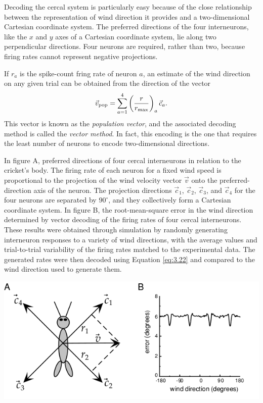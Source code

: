 \begin{rem}
  Decoding the cercal system is particularly easy because of the close relationship between the representation of wind direction it provides and a
two-dimensional Cartesian coordinate system. The preferred directions
of the four interneurons, like the $x$ and $y$ axes of a Cartesian coordinate
system, lie along two perpendicular directions. Four neurons
are required, rather than two, because firing rates cannot represent negative projections.
\end{rem}

\begin{prop}
  If $r_{a}$ is the spike-count fring rate of neuron $a$, an estimate of
  the wind direction on any given trial can be obtained from the
  direction of the vector
  \begin{equation}
    \label{eq:3.22}
    \vec{v}_{\rm{pop}}=\sum\limits_{a=1}^4\left( \frac{r}{r_{\max}} \right)_a\vec{c}_a.
  \end{equation}
  This vector is known as the \emph{population vector}, and the associated decoding
  method is called the \emph{vector method}. In fact, this encoding is
  the one that requires the least number of neurons to encode
  two-dimensional directions.
\end{prop}

\begin{exm}
In figure A, preferred directions of four cercal interneurons in relation to the
cricket’s body. The firing rate of each neuron for a fixed wind speed is proportional to the projection of the wind velocity vector $\vec{v}$ onto the preferred-direction
axis of the neuron. The projection directions
$\vec{c}_{1}$, $\vec{c}_{2}$, $\vec{c}_{3}$, and $\vec{c}_{4}$ for the four neurons
are separated by  $90^{\circ}$, and they collectively form a Cartesian coordinate system.
In figure B, the root-mean-square error in the wind direction determined by vector decoding of the firing rates of four cercal interneurons. These results were obtained
through simulation by randomly generating interneuron responses to a variety of
wind directions, with the average values and trial-to-trial variability of the firing
rates matched to the experimental data. The generated rates were then decoded
using Equation \ref{eq:3.22} and compared to the wind direction used
to generate them.
   \begin{center}
    \includegraphics[scale = 0.4]{./png/3-5}
    \label{fig:3.5AB}
  \end{center}
  \end{exm}

